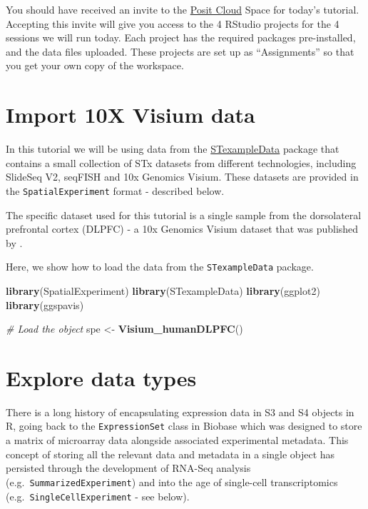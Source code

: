 \documentclass[
]{book}
\newenvironment{Shaded}{\begin{snugshade}}{\end{snugshade}}
\newcommand{\CommentTok}[1]{\textcolor[rgb]{0.56,0.35,0.01}{\textit{#1}}}
\newcommand{\FunctionTok}[1]{\textcolor[rgb]{0.13,0.29,0.53}{\textbf{#1}}}
\newcommand{\NormalTok}[1]{#1}
\newcommand{\OtherTok}[1]{\textcolor[rgb]{0.56,0.35,0.01}{#1}}
\begin{document}
You should have received an invite to the \href{https://posit.cloud/}{Posit Cloud} Space for today's tutorial. Accepting this invite will give you access to the 4 RStudio projects for the 4 sessions we will run today. Each project has the required packages pre-installed, and the data files uploaded. These projects are set up as ``Assignments'' so that you get your own copy of the workspace.

\hypertarget{import-10x-visium-data}{%
\section{Import 10X Visium data}\label{import-10x-visium-data}}

In this tutorial we will be using data from the \href{https://bioconductor.org/packages/STexampleData}{STexampleData} package that contains a small collection of STx datasets from different technologies, including SlideSeq V2, seqFISH and 10x Genomics Visium. These datasets are provided in the \texttt{SpatialExperiment} format - described below.

The specific dataset used for this tutorial is a single sample from the dorsolateral prefrontal cortex (DLPFC) - a 10x Genomics Visium dataset that was published by \citet{Maynard2021Mar}.

Here, we show how to load the data from the \texttt{STexampleData} package.

\begin{Shaded}
\begin{Highlighting}[]
\FunctionTok{library}\NormalTok{(SpatialExperiment)}
\FunctionTok{library}\NormalTok{(STexampleData)}
\FunctionTok{library}\NormalTok{(ggplot2)}
\FunctionTok{library}\NormalTok{(ggspavis)}

\CommentTok{\# Load the object}
\NormalTok{spe }\OtherTok{\textless{}{-}} \FunctionTok{Visium\_humanDLPFC}\NormalTok{()}
\end{Highlighting}
\end{Shaded}

\hypertarget{explore-data-types}{%
\section{Explore data types}\label{explore-data-types}}

There is a long history of encapsulating expression data in S3 and S4 objects in R, going back to the \texttt{ExpressionSet} class in Biobase which was designed to store a matrix of microarray data alongside associated experimental metadata. This concept of storing all the relevant data and metadata in a single object has persisted through the development of RNA-Seq analysis (e.g.~\texttt{SummarizedExperiment}) and into the age of single-cell transcriptomics (e.g.~\texttt{SingleCellExperiment} - see below).
\end{document}

